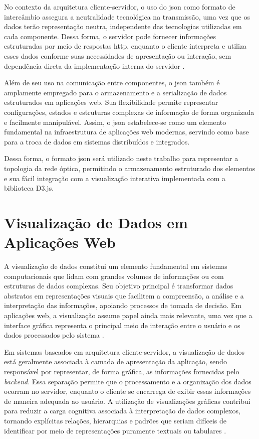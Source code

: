 No contexto da arquitetura cliente-servidor, o uso do \gls{json} como formato de intercâmbio assegura a neutralidade tecnológica na transmissão, uma vez que os dados terão representação neutra, independente das tecnologias utilizadas em cada componente. Dessa forma, o servidor pode fornecer informações estruturadas por meio de respostas \gls{http}, enquanto o cliente interpreta e utiliza esses dados conforme suas necessidades de apresentação ou interação, sem dependência direta da implementação interna do servidor \cite{sommerville2016software}.

Além de seu uso na comunicação entre componentes, o \gls{json} também é amplamente empregado para o armazenamento e a serialização de dados estruturados em aplicações web. Sua flexibilidade permite representar configurações, estados e estruturas complexas de informação de forma organizada e facilmente manipulável. Assim, o \gls{json} estabelece-se como um elemento fundamental na infraestrutura de aplicações web modernas, servindo como base para a troca de dados em sistemas distribuídos e integrados.

Dessa forma, o formato \gls{json} será utilizado neste trabalho para representar a topologia da rede óptica, permitindo o armazenamento estruturado dos elementos e sua fácil integração com a visualização interativa implementada com a biblioteca D3.js.

\section{Visualização de Dados em Aplicações Web}

A visualização de dados constitui um elemento fundamental em sistemas computacionais que lidam com grandes volumes de informações ou com estruturas de dados complexas. Seu objetivo principal é transformar dados abstratos em representações visuais que facilitem a compreensão, a análise e a interpretação das informações, apoiando processos de tomada de decisão. Em aplicações web, a visualização assume papel ainda mais relevante, uma vez que a interface gráfica representa o principal meio de interação entre o usuário e os dados processados pelo sistema \cite{card1999information,ware2013information}.

Em sistemas baseados em arquitetura cliente-servidor, a visualização de dados está geralmente associada à camada de apresentação da aplicação, sendo responsável por representar, de forma gráfica, as informações fornecidas pelo \textit{backend}. Essa separação permite que o processamento e a organização dos dados ocorram no servidor, enquanto o cliente se encarrega de exibir essas informações de maneira adequada ao usuário. A utilização de visualizações gráficas contribui para reduzir a carga cognitiva associada à interpretação de dados complexos, tornando explícitas relações, hierarquias e padrões que seriam difíceis de identificar por meio de representações puramente textuais ou tabulares \cite{card1999information}.

